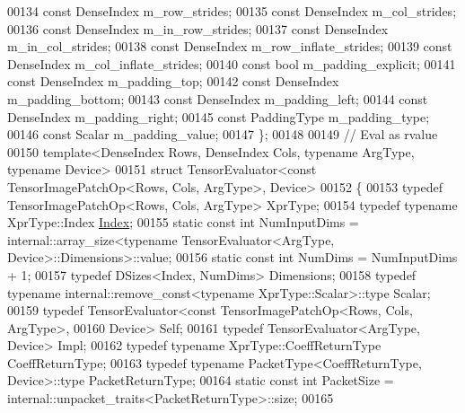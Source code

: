 \begin{DoxyCode}
00134     \textcolor{keyword}{const} DenseIndex m\_row\_strides;
00135     \textcolor{keyword}{const} DenseIndex m\_col\_strides;
00136     \textcolor{keyword}{const} DenseIndex m\_in\_row\_strides;
00137     \textcolor{keyword}{const} DenseIndex m\_in\_col\_strides;
00138     \textcolor{keyword}{const} DenseIndex m\_row\_inflate\_strides;
00139     \textcolor{keyword}{const} DenseIndex m\_col\_inflate\_strides;
00140     \textcolor{keyword}{const} \textcolor{keywordtype}{bool} m\_padding\_explicit;
00141     \textcolor{keyword}{const} DenseIndex m\_padding\_top;
00142     \textcolor{keyword}{const} DenseIndex m\_padding\_bottom;
00143     \textcolor{keyword}{const} DenseIndex m\_padding\_left;
00144     \textcolor{keyword}{const} DenseIndex m\_padding\_right;
00145     \textcolor{keyword}{const} PaddingType m\_padding\_type;
00146     \textcolor{keyword}{const} Scalar m\_padding\_value;
00147 \};
00148 
00149 \textcolor{comment}{// Eval as rvalue}
00150 \textcolor{keyword}{template}<DenseIndex Rows, DenseIndex Cols, \textcolor{keyword}{typename} ArgType, \textcolor{keyword}{typename} Device>
00151 \textcolor{keyword}{struct }TensorEvaluator<const TensorImagePatchOp<Rows, Cols, ArgType>, Device>
00152 \{
00153   \textcolor{keyword}{typedef} TensorImagePatchOp<Rows, Cols, ArgType> XprType;
00154   \textcolor{keyword}{typedef} \textcolor{keyword}{typename} XprType::Index \hyperlink{namespace_eigen_a62e77e0933482dafde8fe197d9a2cfde}{Index};
00155   \textcolor{keyword}{static} \textcolor{keyword}{const} \textcolor{keywordtype}{int} NumInputDims = internal::array\_size<typename TensorEvaluator<ArgType,
       Device>::Dimensions>::value;
00156   \textcolor{keyword}{static} \textcolor{keyword}{const} \textcolor{keywordtype}{int} NumDims = NumInputDims + 1;
00157   \textcolor{keyword}{typedef} DSizes<Index, NumDims> Dimensions;
00158   \textcolor{keyword}{typedef} \textcolor{keyword}{typename} internal::remove\_const<typename XprType::Scalar>::type Scalar;
00159   \textcolor{keyword}{typedef} TensorEvaluator<const TensorImagePatchOp<Rows, Cols, ArgType>,
00160                           Device> Self;
00161   \textcolor{keyword}{typedef} TensorEvaluator<ArgType, Device> Impl;
00162   \textcolor{keyword}{typedef} \textcolor{keyword}{typename} XprType::CoeffReturnType CoeffReturnType;
00163   \textcolor{keyword}{typedef} \textcolor{keyword}{typename} PacketType<CoeffReturnType, Device>::type PacketReturnType;
00164   \textcolor{keyword}{static} \textcolor{keyword}{const} \textcolor{keywordtype}{int} PacketSize = internal::unpacket\_traits<PacketReturnType>::size;
00165 

\end{DoxyCode}

